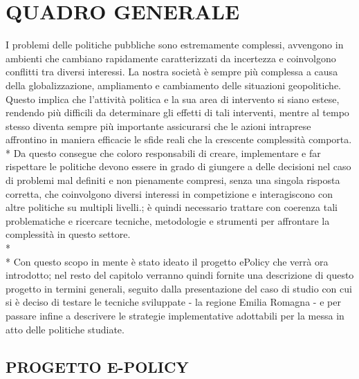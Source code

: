 \documentclass[12pt,a4paper,openright,twoside]{report}
\begin{document}
\chapter{\nohyphens{QUADRO GENERALE}}

I problemi delle politiche pubbliche sono estremamente complessi, avvengono in ambienti che cambiano rapidamente caratterizzati da incertezza e coinvolgono conflitti tra diversi interessi. La nostra società è sempre più complessa a causa della globalizzazione, ampliamento e cambiamento delle situazioni geopolitiche. Questo implica che l'attività politica e la sua area di intervento si siano estese, rendendo più difficili da determinare gli effetti di tali interventi, mentre al tempo stesso diventa sempre più importante assicurarsi che le azioni intraprese affrontino in maniera efficacie le sfide reali che la crescente complessità comporta.\\*
Da questo consegue che coloro responsabili di creare, implementare e far rispettare le politiche devono essere in grado di giungere a delle decisioni nel caso di problemi mal definiti e non pienamente compresi, senza una singola risposta corretta, che coinvolgono diversi interessi in competizione e interagiscono con altre politiche su multipli livelli.; è quindi necessario trattare con coerenza tali problematiche e ricercare tecniche, metodologie e strumenti per affrontare la complessità in questo settore.\\*\\*
Con questo scopo in mente è stato ideato il progetto ePolicy che verrà ora introdotto; nel resto del capitolo verranno quindi fornite una descrizione di questo progetto in termini generali, seguito dalla presentazione del caso di studio con cui si è deciso di testare le tecniche sviluppate - la regione Emilia Romagna - e per passare infine a descrivere le strategie implementative adottabili per la messa in atto delle politiche studiate.


\section[E-POLICY]{PROGETTO E-POLICY}
\end{document}
